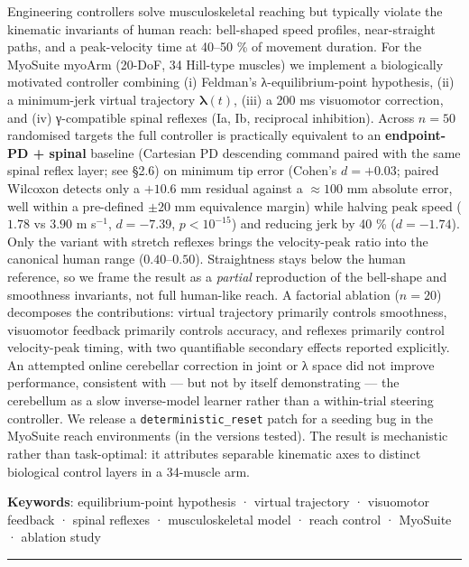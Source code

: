 \documentclass[
  11pt,
]{article}
\begin{document}
Engineering controllers solve musculoskeletal reaching but typically
violate the kinematic invariants of human reach: bell-shaped speed
profiles, near-straight paths, and a peak-velocity time at 40--50 \% of
movement duration. For the MyoSuite myoArm (20-DoF, 34 Hill-type
muscles) we implement a biologically motivated controller combining (i)
Feldman's λ-equilibrium-point hypothesis, (ii) a minimum-jerk virtual
trajectory \(\boldsymbol{\lambda}(t)\), (iii) a 200 ms visuomotor
correction, and (iv) γ-compatible spinal reflexes (Ia, Ib, reciprocal
inhibition). Across \(n = 50\) randomised targets the full controller is
practically equivalent to an \textbf{endpoint-PD + spinal} baseline
(Cartesian PD descending command paired with the same spinal reflex
layer; see §2.6) on minimum tip error (Cohen's \(d = +0.03\); paired
Wilcoxon detects only a \(+10.6\) mm residual against a \(\approx 100\)
mm absolute error, well within a pre-defined \(\pm 20\) mm equivalence
margin) while halving peak speed (\(1.78\) vs \(3.90\) m s\(^{-1}\),
\(d = -7.39\), \(p < 10^{-15}\)) and reducing jerk by 40 \%
(\(d = -1.74\)). Only the variant with stretch reflexes brings the
velocity-peak ratio into the canonical human range (\(0.40\)--\(0.50\)).
Straightness stays below the human reference, so we frame the result as
a \emph{partial} reproduction of the bell-shape and smoothness
invariants, not full human-like reach. A factorial ablation (\(n = 20\))
decomposes the contributions: virtual trajectory primarily controls
smoothness, visuomotor feedback primarily controls accuracy, and
reflexes primarily control velocity-peak timing, with two quantifiable
secondary effects reported explicitly. An attempted online cerebellar
correction in joint or λ space did not improve performance, consistent
with --- but not by itself demonstrating --- the cerebellum as a slow
inverse-model learner rather than a within-trial steering controller. We
release a \texttt{deterministic\_reset} patch for a seeding bug in the
MyoSuite reach environments (in the versions tested). The result is
mechanistic rather than task-optimal: it attributes separable kinematic
axes to distinct biological control layers in a 34-muscle arm.

\textbf{Keywords}: equilibrium-point hypothesis · virtual trajectory ·
visuomotor feedback · spinal reflexes · musculoskeletal model · reach
control · MyoSuite · ablation study

\begin{center}\rule{0.5\linewidth}{0.5pt}\end{center}
\end{document}
